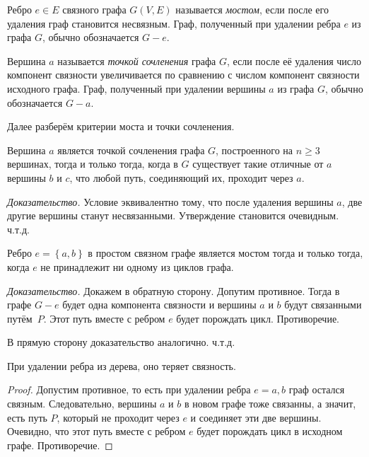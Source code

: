 \begin{definition}
	Ребро $e \in E$ связного графа $G(V, E)$ называется \emph{мостом}, если после его удаления граф становится несвязным. 
	Граф, полученный при удалении ребра $e$ из графа $G$, обычно обозначается $G - e$.
\end{definition}

\begin{definition}
	Вершина $a$ называется \emph{точкой сочленения} графа $G$, если после её удаления число компонент связности увеличивается 
	по сравнению с числом компонент связности исходного графа. Граф, полученный при удалении вершины $a$ из графа $G$, обычно обозначается $G - a$.
\end{definition}

	Далее разберём критерии моста и точки сочленения.
	
\begin{statement}
	Вершина $a$ является точкой сочленения графа $G$, построенного на $n \geqslant 3$ вершинах, тогда и только тогда, 
	когда в $G$ существует такие отличные от $a$ вершины $b$ и $c$, что любой путь, соединяющий их, проходит через $a$.
	
	\emph{Доказательство.} Условие эквивалентно тому, что после удаления вершины $a$, две другие вершины станут несвязанными. 
	Утверждение становится очевидным. ч.т.д.
\end{statement}

\begin{statement}
	Ребро $e = \left\lbrace a, b \right\rbrace$ в простом связном графе является мостом тогда и только тогда, 
	когда $e$ не принадлежит ни одному из циклов графа.
	
	\emph{Доказательство.} Докажем в обратную сторону. Допутим противное. Тогда в графе $G - e$ будет одна компонента 
	связности и вершины $a$ и $b$ будут связанными путём~$P$. Этот путь вместе с ребром $e$ будет порождать цикл. Противоречие.
	
	В прямую сторону доказательство аналогично. ч.т.д.
\end{statement}

\begin{statement}
	При удалении ребра из дерева, оно теряет связность.	
\begin{proof}
	Допустим противное, то есть при удалении ребра $e = {a, b}$ граф остался связным. Следовательно, вершины $a$ и $b$ в новом графе 
	тоже связанны, а значит, есть путь $P$, который не проходит через $e$ и соединяет эти две вершины. Очевидно, что этот путь вместе 
	с ребром $e$ будет порождать цикл в исходном графе. Противоречие.
\end{proof}
\end{statement}


